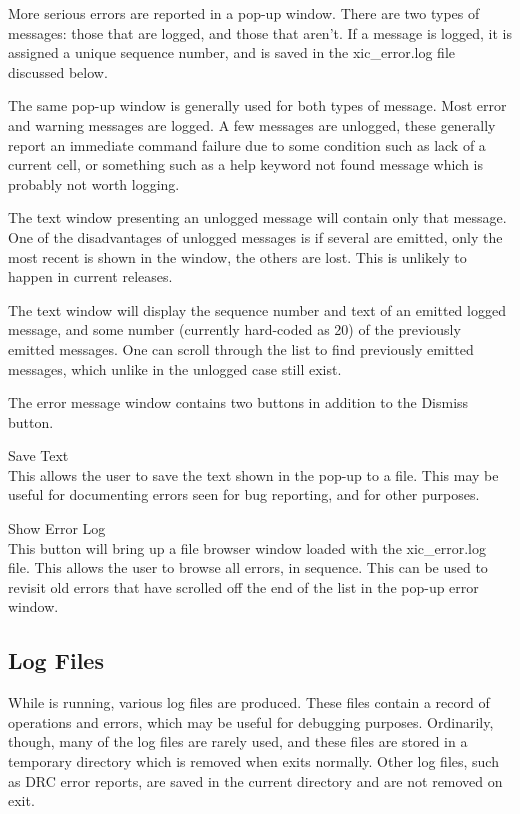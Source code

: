 \begin{itemize}
More serious errors are reported in a pop-up window.  There are two
types of messages:  those that are logged, and those that aren't.  If
a message is logged, it is assigned a unique sequence number, and is
saved in the {\vt xic\_error.log} file discussed below.

The same pop-up window is generally used for both types of message. 
Most error and warning messages are logged.  A few messages are
unlogged, these generally report an immediate command failure due to
some condition such as lack of a current cell, or something such as a
help keyword not found message which is probably not worth logging.

The text window presenting an unlogged message will contain only that
message.  One of the disadvantages of unlogged messages is if several
are emitted, only the most recent is shown in the window, the others
are lost.  This is unlikely to happen in current {\Xic} releases.

The text window will display the sequence number and text of an
emitted logged message, and some number (currently hard-coded as 20)
of the previously emitted messages.  One can scroll through the list
to find previously emitted messages, which unlike in the unlogged case
still exist.

The error message window contains two buttons in addition to the
{\cb Dismiss} button.

\begin{description}
\item{\cb Save Text}\\
This allows the user to save the text shown in the pop-up to a file. 
This may be useful for documenting errors seen for bug reporting, and
for other purposes.

\item{\cb Show Error Log}\\
This button will bring up a file browser window loaded with the {\vt
xic\_error.log} file.  This allows the user to browse all errors, in
sequence.  This can be used to revisit old errors that have scrolled
off the end of the list in the pop-up error window.
\end{description}

\subsection{Log Files}
\label{logfiles}

While {\Xic} is running, various log files are produced.  These files
contain a record of operations and errors, which may be useful for
debugging purposes.  Ordinarily, though, many of the log files are
rarely used, and these files are stored in a temporary directory which
is removed when {\Xic} exits normally.  Other log files, such as DRC
error reports, are saved in the current directory and are not removed
on exit.


\end{itemize}
